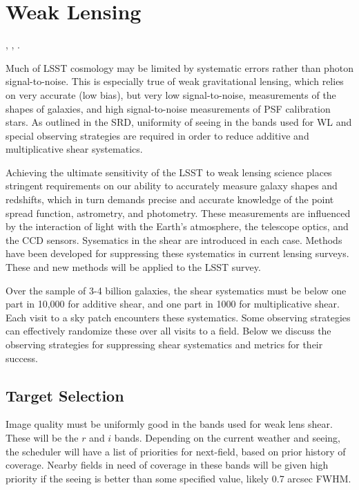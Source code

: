 %
%

\section{Weak Lensing}
\def\secname{wl}\label{sec:\secname}

,
,
.

Much of LSST cosmology may be limited by systematic errors rather than
photon signal-to-noise. This is especially true of weak gravitational
lensing,  which relies on very accurate (\ie low bias), but very low
signal-to-noise, measurements of the shapes of galaxies, and high
signal-to-noise measurements of PSF calibration stars. As outlined in the SRD,
uniformity of seeing in the bands used for WL and special observing strategies
are required in order to reduce additive and multiplicative shear systematics.

Achieving the ultimate sensitivity of the LSST to weak lensing science places
stringent requirements on our ability to accurately measure galaxy shapes and redshifts,
which in turn demands precise and accurate knowledge of the point spread function,
astrometry, and photometry. These measurements are influenced by the interaction of
light with the Earth's atmosphere, the telescope optics, and the CCD sensors. Sysematics
in the shear are introduced in each case.   Methods have been developed for suppressing
these systematics in current lensing surveys. These and new methods will be applied to
the LSST survey.

Over the sample of 3-4 billion galaxies, the shear systematics must be below
one part in 10,000 for additive shear, and one part in 1000 for multiplicative shear.
Each visit to a sky patch encounters these systematics. Some observing strategies can
effectively randomize these over all visits to a field.  Below we discuss the observing
strategies for suppressing shear systematics and metrics for their success.

\subsection{Target Selection}

Image quality must be uniformly good in the bands used for weak lens shear.  These will be
the $r$ and $i$ bands.   Depending on the current weather and seeing, the scheduler
will have a list of priorities for next-field, based on prior history of coverage.
Nearby fields in need of coverage in these bands will be given high priority if the
seeing is better than some specified value, likely 0.7 arcsec FWHM.


